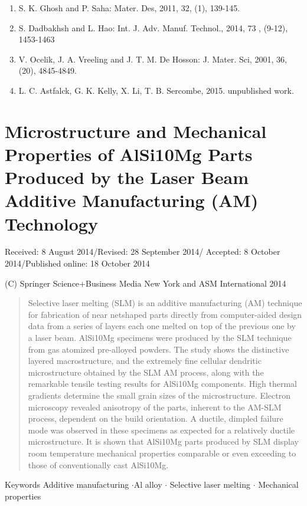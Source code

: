 \documentclass[10pt]{article}
\begin{document}
\begin{enumerate}
  \item S. K. Ghosh and P. Saha: Mater. Des, 2011, 32, (1), 139-145.

  \item S. Dadbakhsh and L. Hao: Int. J. Adv. Manuf. Technol., 2014, 73 , (9-12), 1453-1463

  \item V. Ocelik, J. A. Vreeling and J. T. M. De Hosson: J. Mater. Sci, 2001, 36, (20), 4845-4849.

  \item L. C. Astfalck, G. K. Kelly, X. Li, T. B. Sercombe, 2015. unpublished work.

\end{enumerate}

\section*{Microstructure and Mechanical Properties of AlSi10Mg Parts Produced by the Laser Beam Additive Manufacturing (AM) Technology }
Received: 8 August 2014/Revised: 28 September 2014/ Accepted: 8 October 2014/Published online: 18 October 2014

(C) Springer Science+Business Media New York and ASM International 2014

\begin{abstract}
Selective laser melting (SLM) is an additive manufacturing (AM) technique for fabrication of near netshaped parts directly from computer-aided design data from a series of layers each one melted on top of the previous one by a laser beam. AlSi10Mg specimens were produced by the SLM technique from gas atomized pre-alloyed powders. The study shows the distinctive layered macrostructure, and the extremely fine cellular dendritic microstructure obtained by the SLM AM process, along with the remarkable tensile testing results for AlSi10Mg components. High thermal gradients determine the small grain sizes of the microstructure. Electron microscopy revealed anisotropy of the parts, inherent to the AM-SLM process, dependent on the build orientation. A ductile, dimpled failure mode was observed in these specimens as expected for a relatively ductile microstructure. It is shown that AlSi10Mg parts produced by SLM display room temperature mechanical properties comparable or even exceeding to those of conventionally cast AlSi10Mg.
\end{abstract}

Keywords Additive manufacturing $\cdot \mathrm{Al}$ alloy $\cdot$ Selective laser melting $\cdot$ Mechanical properties
\end{document}
